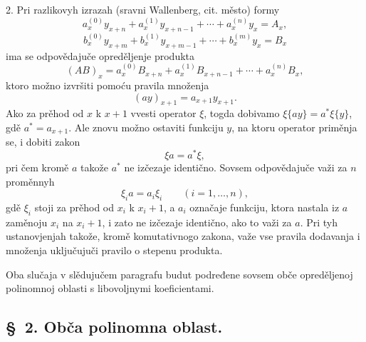 \documentclass[11pt]{article}
\begin{document}
2. Pri razlikovyh izrazah (sravni Wallenberg, cit. město) formy
\[
 a_x^{(0)}y_{x+n}+a_x^{(1)}y_{x+n-1}+\cdots+a_x^{(n)}y_x=A_x,
\]
\[
 b_x^{(0)}y_{x+m}+b_x^{(1)}y_{x+m-1}+\cdots+b_x^{(m)}y_x=B_x
\]
ima se odpovědajuče opreděljenje produkta
\[
 (AB)_x=a_x^{(0)}B_{x+n}+a_x^{(1)}B_{x+n-1}+\cdots+a_x^{(n)}B_x,
\]
ktoro možno izvršiti pomoću pravila množenja
\[
 (ay)_{x+1}=a_{x+1}y_{x+1}.
\]
Ako za prěhod od \(x\) k \(x+1\) vvesti operator \(\xi\), togda dobivamo \(\xi\{ay\}=a^*\xi\{y\}\), gdě \(a^*=a_{x+1}\). Ale znovu možno ostaviti funkciju \(y\), na ktoru operator priměnja se, i dobiti zakon
\begin{equation}
 \xi a=a^*\xi,
\tag{3}
\end{equation}
pri čem kromě \(a\) takože \(a^*\) ne izčezaje identično. Sovsem odpovědajuče važi za \(n\) proměnnyh
\begin{equation}
 \xi_i a=a_i\xi_i\qquad (i=1,\ldots,n),
\tag{4}
\end{equation}
gdě \(\xi_i\) stoji za prěhod od \(x_i\) k \(x_i+1\), a \(a_i\) označaje funkciju, ktora nastala iz \(a\) zaměnoju \(x_i\) na \(x_i+1\), i zato ne izčezaje identično, ako to važi za \(a\). Pri tyh ustanovjenjah takože, kromě komutativnogo zakona, važe vse pravila dodavanja i množenja uključujuči pravilo o stepenu produkta.

Oba slučaja v slědujučem paragrafu budut podređene sovsem obče opreděljenoj polinomnoj oblasti s libovoljnymi koeficientami.

\subsection*{\S~2. Obča polinomna oblast.}
\end{document}
